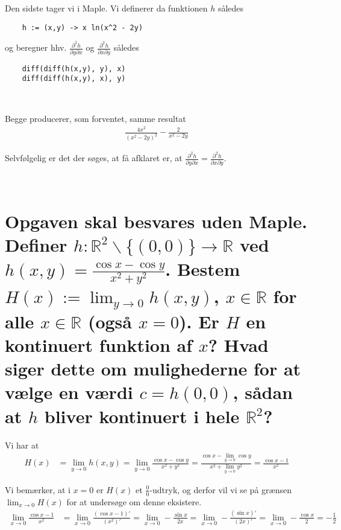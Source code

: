 \documentclass[11pt,a4paper]{article}
\newcommand{\limit}[2]{\lim_{#1 \rightarrow #2}}
\begin{document}
\begin{multicols}{2}

    Den sidste tager vi i Maple. Vi definerer da funktionen $h$ således
    \begin{lstlisting}
    h := (x,y) -> x ln(x^2 - 2y)
    \end{lstlisting}
    og beregner hhv. $\frac{\partial^2 h}{\partial y \partial x}$ og
    $\frac{\partial^2 h}{\partial x \partial y}$ således
    \begin{lstlisting}
    diff(diff(h(x,y), y), x)
    diff(diff(h(x,y), x), y)
    \end{lstlisting}
    
    \vfill{\ }\columnbreak

    Begge producerer, som forventet, samme resultat
    \begin{align}
        \frac{4x^2}{(x^2 - 2y)^2} - \frac{2}{x^2 - 2y} 
    \end{align}

    Selvfølgelig er det der søges, at få afklaret er, at
    $\frac{\partial^2 h}{\partial y \partial x} =
    \frac{\partial^2 h}{\partial x \partial y}$.

    \vfill{\ }
\end{multicols}

\section
{
    \mdseries
    Opgaven skal besvares uden Maple. Definer $h : \mathbb{R}^2 \backslash
    \{(0,0)\} \rightarrow \mathbb{R}$ ved $h(x,y) = \frac{\cos x - \cos y}
    {x^2 + y^2}$. Bestem $H(x) := \limit{y}{0} h(x,y)$, $x \in \mathbb{R}$ for
    alle $x \in \mathbb{R}$ (også $x = 0$). Er $H$ en kontinuert funktion af
    $x$? Hvad siger dette om mulighederne for at vælge en værdi $c = h(0,0)$,
    sådan at $h$ bliver kontinuert i hele $\mathbb{R}^2$?
}
Vi har at
\begin{align}
    H(x) &= \limit{y}{0} h(x,y)
          = \limit{y}{0} \frac{\cos x - \cos y}{x^2 + y^2}
          = \frac{\cos x - \limit{y}{0} \cos y}{x^2 + \limit{y}{0} y^2}
          = \frac{\cos x - 1}{x^2}
\end{align}

Vi bemærker, at i $x = 0$ er $H(x)$ et $\frac{0}{0}$-udtryk, og derfor vil vi
se på grænsen $\limit{x}{0} H(x)$ for at undersøge om denne eksistere.
\begin{align}
    \limit{x}{0} \frac{\cos x - 1}{x^2}
    &= \limit{x}{0} \frac{(\cos x - 1)'}{(x^2)'}
     = \limit{x}{0} -\frac{\sin x}{2x}
     = \limit{x}{0} -\frac{(\sin x)'}{(2x)'}
     = \limit{x}{0} -\frac{\cos x}{2}
     = -\frac{1}{2}
\end{align}
\end{document}
